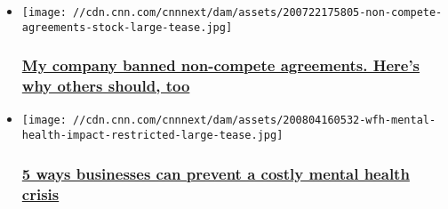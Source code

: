 \begin{itemize}
\item
  \href{/2020/08/03/perspectives/non-compete-clauses-thumbtack/index.html}{}

  \texttt{[image: //cdn.cnn.com/cnnnext/dam/assets/200722175805-non-compete-agreements-stock-large-tease.jpg]}

  \hypertarget{my-company-banned-non-compete-agreements-heres-why-others-should-too}{%
  \subsubsection{\texorpdfstring{\href{/2020/08/03/perspectives/non-compete-clauses-thumbtack/index.html}{My
  company banned non-compete agreements. Here's why others should,
  too}}{My company banned non-compete agreements. Here's why others should, too}}\label{my-company-banned-non-compete-agreements-heres-why-others-should-too}}
\item
  \href{/2020/08/05/perspectives/mental-health-covid-business/index.html}{}

  \texttt{[image: //cdn.cnn.com/cnnnext/dam/assets/200804160532-wfh-mental-health-impact-restricted-large-tease.jpg]}

  \hypertarget{5-ways-businesses-can-prevent-a-costly-mental-health-crisis}{%
  \subsubsection{\texorpdfstring{\href{/2020/08/05/perspectives/mental-health-covid-business/index.html}{5
  ways businesses can prevent a costly mental health
  crisis}}{5 ways businesses can prevent a costly mental health crisis}}\label{5-ways-businesses-can-prevent-a-costly-mental-health-crisis}}
\end{itemize}

